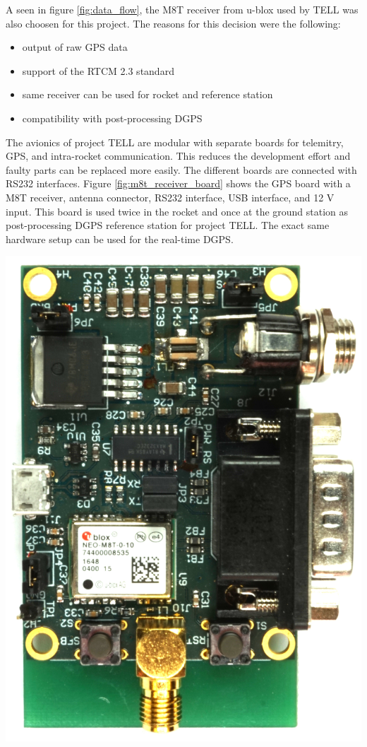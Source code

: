 \begin{minipage}{0.6\textwidth}
  A seen in figure \ref{fig:data_flow}, the M8T receiver from u-blox used by TELL was also choosen for this project.
  The reasons for this decision were the following:
  \begin{itemize}
  \item output of raw GPS data
  \item support of the RTCM 2.3 standard
  \item same receiver can be used for rocket and reference station
  \item compatibility with post-processing DGPS
  \end{itemize}
  The avionics of project TELL are modular with separate boards for telemitry, GPS, and intra-rocket communication.
  This reduces the development effort and faulty parts can be replaced more easily.
  The different boards are connected with RS232 interfaces.
  Figure \ref{fig:m8t_receiver_board} shows the GPS board with a M8T receiver, antenna connector, RS232 interface, USB interface, and 12 V input.
  This board is used twice in the rocket and once at the ground station as post-processing DGPS reference station for project TELL.
  The exact same hardware setup can be used for the real-time DGPS.
\end{minipage}
\hfill
\begin{minipage}{0.37\textwidth}
 \centering
 \includegraphics[width=\textwidth]{images/M8T_Receiver_Board.jpg}
 \label{fig:m8t_receiver_board}
\end{minipage}

